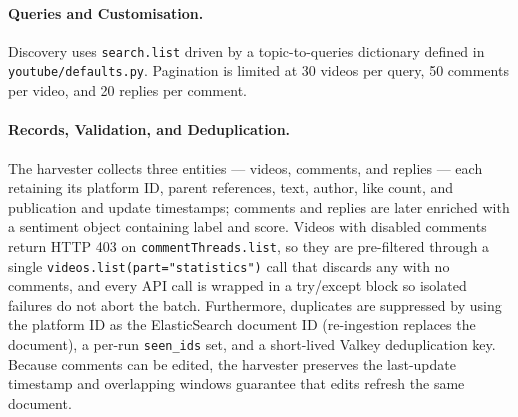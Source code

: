 \paragraph{Queries and Customisation.}
Discovery uses \texttt{search.list} driven by a topic-to-queries dictionary defined in \texttt{youtube/defaults.py}. Pagination is limited at 30 videos per query, 50 comments per video, and 20 replies per comment.

\paragraph{Records, Validation, and Deduplication.}
The harvester collects three entities --- videos, comments, and replies --- each retaining its platform ID, parent references, text, author, like count, and publication and update timestamps; comments and replies are later enriched with a sentiment object containing label and score. 
Videos with disabled comments return HTTP 403 on \texttt{commentThreads.list}, so they are pre-filtered through a single \texttt{videos.list(part="statistics")} call that discards any with no comments, and every API call is wrapped in a try/except block so isolated failures do not abort the batch. 
Furthermore, duplicates are suppressed by using the platform ID as the ElasticSearch document ID (re-ingestion replaces the document), a per-run \texttt{seen\_ids} set, and a short-lived Valkey deduplication key. 
Because comments can be edited, the harvester preserves the last-update timestamp and overlapping windows guarantee that edits refresh the same document.


